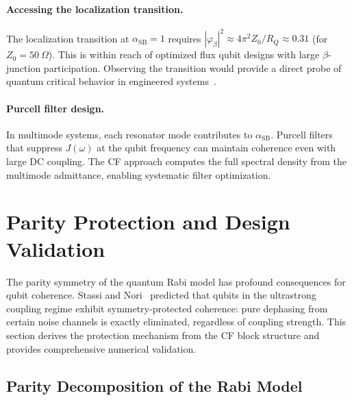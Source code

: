 \documentclass[reprint, floatfix, superscriptaddress, amsmath, amssymb, longbibliography]{revtex4-2}
\begin{document}
\paragraph{Accessing the localization transition.} The localization transition at $\alpha_{\mathrm{SB}} = 1$ requires $|\varphi_\beta|^2 \approx 4\pi^2 Z_0/R_Q \approx 0.31$ (for $Z_0 = 50~\Omega$). This is within reach of optimized flux qubit designs with large $\beta$-junction participation. Observing the transition would provide a direct probe of quantum critical behavior in engineered systems~\cite{Leggett1987, Chakravarty1984}.

\paragraph{Purcell filter design.} In multimode systems, each resonator mode contributes to $\alpha_{\mathrm{SB}}$. Purcell filters that suppress $J(\omega)$ at the qubit frequency can maintain coherence even with large DC coupling. The CF approach computes the full spectral density from the multimode admittance, enabling systematic filter optimization.





\section{Parity Protection and Design Validation}
\label{sec:parity_validation}

The parity symmetry of the quantum Rabi model has profound consequences for qubit coherence. Stassi and Nori~\cite{Stassi2018} predicted that qubits in the ultrastrong coupling regime exhibit symmetry-protected coherence: pure dephasing from certain noise channels is exactly eliminated, regardless of coupling strength. This section derives the protection mechanism from the CF block structure and provides comprehensive numerical validation.

\subsection{Parity Decomposition of the Rabi Model}
\label{sec:parity_decomposition}
\end{document}
